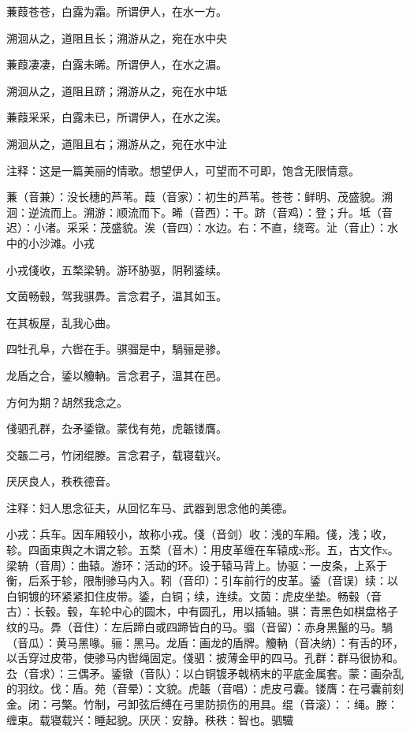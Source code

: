 \documentclass[12pt,UTF8]{ctexbook}
\begin{document}
蒹葭苍苍，白露为霜。所谓伊人，在水一方。

溯洄从之，道阻且长；溯游从之，宛在水中央

蒹葭凄凄，白露未晞。所谓伊人，在水之湄。

溯洄从之，道阻且跻；溯游从之，宛在水中坻

蒹葭采采，白露未已，所谓伊人，在水之涘。

溯洄从之，道阻且右；溯游从之，宛在水中沚

注释：这是一篇美丽的情歌。想望伊人，可望而不可即，饱含无限情意。

蒹（音兼）：没长穗的芦苇。葭（音家）：初生的芦苇。苍苍：鲜明、茂盛貌。溯洄：逆流而上。溯游：顺流而下。晞（音西）：干。跻（音鸡）：登；升。坻（音迟）：小渚。采采：茂盛貌。涘（音四）：水边。右：不直，绕弯。沚（音止）：水中的小沙滩。小戎

小戎俴收，五楘梁辀。游环胁驱，阴靷鋈续。

文茵畅毂，驾我骐馵。言念君子，温其如玉。

在其板屋，乱我心曲。

四牡孔阜，六辔在手。骐骝是中，騧骊是骖。

龙盾之合，鋈以觼軜。言念君子，温其在邑。

方何为期？胡然我念之。

俴驷孔群，厹矛鋈镦。蒙伐有苑，虎韔镂膺。

交韔二弓，竹闭绲滕。言念君子，载寝载兴。

厌厌良人，秩秩德音。

注释：妇人思念征夫，从回忆车马、武器到思念他的美德。

小戎：兵车。因车厢较小，故称小戎。俴（音剑）收：浅的车厢。俴，浅；收，轸。四面束舆之木谓之轸。五楘（音木）：用皮革缠在车辕成x形。五，古文作x。梁辀（音周）：曲辕。游环：活动的环。设于辕马背上。协驱：一皮条，上系于衡，后系于轸，限制骖马内入。靷（音印）：引车前行的皮革。鋈（音误）续：以白铜镀的环紧紧扣住皮带。鋈，白铜；续，连续。文茵：虎皮坐垫。畅毂（音古）：长毂。毂，车轮中心的圆木，中有圆孔，用以插轴。骐：青黑色如棋盘格子纹的马。馵（音住）：左后蹄白或四蹄皆白的马。骝（音留）：赤身黑鬣的马。騧（音瓜）：黄马黑喙。骊：黑马。龙盾：画龙的盾牌。觼軜（音决纳）：有舌的环，以舌穿过皮带，使骖马内辔绳固定。俴驷：披薄金甲的四马。孔群：群马很协和。厹（音求）：三偶矛。鋈镦（音队）：以白铜镀矛戟柄末的平底金属套。蒙：画杂乱的羽纹。伐：盾。苑（音晕）：文貌。虎韔（音唱）：虎皮弓囊。镂膺：在弓囊前刻金。闭：弓檠。竹制，弓卸弦后缚在弓里防损伤的用具。绲（音滚）：：绳。滕：缠束。载寝载兴：睡起貌。厌厌：安静。秩秩：智也。驷驖
\end{document}
